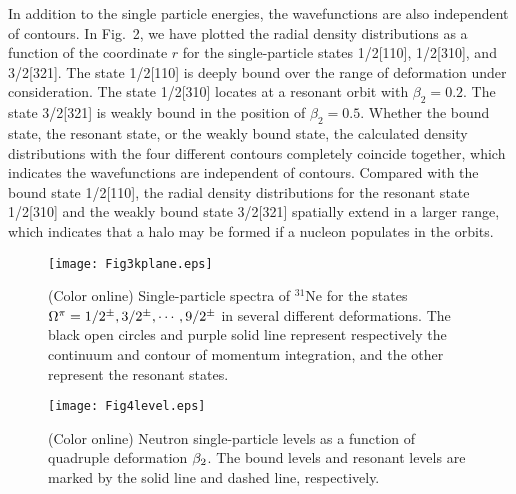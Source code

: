 \documentclass[twocolumn,prc,showpacs,preprintnumbers,superscriptaddress,floatfix]{revtex4}
\begin{document}
In addition to the single particle energies, the wavefunctions are also
independent of contours. In Fig.~2, we have plotted the radial density
distributions as a function of the coordinate $r$ for the single-particle
states 1/2[110], 1/2[310], and 3/2[321]. The state 1/2[110] is deeply
bound over the range of deformation under consideration. The state 1/2[310]
locates at a resonant orbit with $\beta_2=0.2$. The state 3/2[321] is weakly bound
in the position of $\beta_2=0.5$. Whether the bound state, the resonant state, or the weakly bound state, the calculated density distributions with the four different contours
completely coincide together, which indicates the wavefunctions are
independent of contours. Compared with the bound state 1/2[110], the radial
density distributions for the resonant state 1/2[310] and the weakly bound
state 3/2[321] spatially extend in a larger range, which indicates that a
halo may be formed if a nucleon populates in the orbits.

\begin{figure}[tph]
\centering
\texttt{[image: Fig3kplane.eps]}
\caption{ (Color online) Single-particle spectra of $^{31}$Ne for the states
$\Omega^{\protect\pi}=1/2^{\pm}, 3/2^{\pm}, \cdots, 9/2^{\pm}$ in several
different deformations. The black open circles and purple solid line
represent respectively the continuum and contour of momentum integration,
and the other represent the resonant states.}
\end{figure}
\begin{figure}[tph]
\centering%
\texttt{[image: Fig4level.eps]}\centering
\caption{(Color online) Neutron single-particle levels as a function of
quadruple deformation $\protect\beta_{2}$. The bound levels and resonant
levels are marked by the solid line and dashed line, respectively.}
\end{figure}
\end{document}
